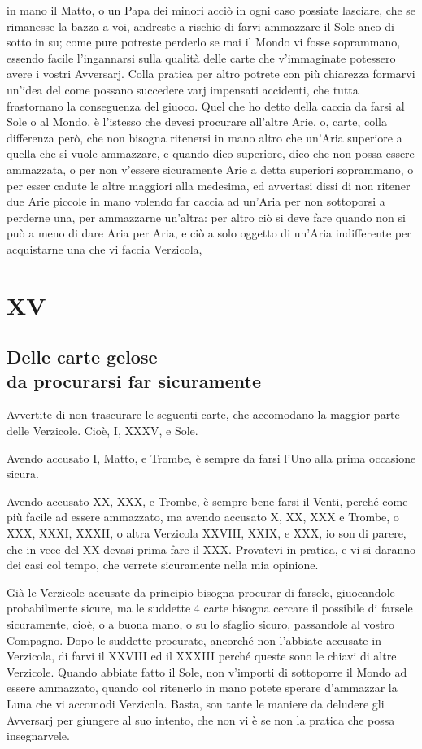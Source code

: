 \documentclass[11pt,a6paper]{article}
\begin{document}
in mano il Matto, o un Papa dei minori acciò in ogni caso possiate lasciare, che se rimanesse la bazza a voi, andreste a rischio di farvi ammazzare il Sole anco di sotto in su; come pure potreste perderlo se mai il Mondo vi fosse soprammano, essendo facile l'ingannarsi sulla qualità delle carte che v'immaginate potessero avere i vostri Avversarj. Colla pratica per altro potrete con più chiarezza formarvi un'idea del come possano succedere varj impensati accidenti, che tutta frastornano la conseguenza del giuoco. Quel che ho detto della caccia da farsi al Sole o al Mondo, è l'istesso che devesi procurare all'altre Arie, o, carte, colla differenza però, che non bisogna ritenersi in mano altro che un'Aria superiore a quella che si vuole ammazzare, e quando dico superiore, dico che non possa essere ammazzata, o per non v'essere sicuramente Arie a detta superiori soprammano, o per esser cadute le altre maggiori alla medesima, ed avvertasi dissi di non ritener due Arie piccole in mano
volendo far caccia ad un'Aria per non sottoporsi a perderne una, per ammazzarne un'altra: per altro ciò si deve fare quando non si può a meno di dare Aria per Aria, e ciò a solo oggetto di un'Aria indifferente per acquistarne una che vi faccia Verzicola,

\section{XV}
\subsection*{Delle carte gelose\\ da procurarsi far sicuramente}

Avvertite di non trascurare le seguenti carte, che accomodano la maggior parte delle Verzicole. Cioè, I, XXXV, e Sole.

Avendo accusato I, Matto, e Trombe, è sempre da farsi l'Uno alla prima occasione sicura.

Avendo accusato XX, XXX, e Trombe, è sempre bene farsi il Venti, perché come più facile ad essere ammazzato, ma avendo accusato X, XX, XXX e Trombe, o XXX, XXXI, XXXII, o altra Verzicola XXVIII, XXIX, e XXX, io son di parere, che in vece del XX devasi prima fare il XXX. Provatevi in pratica, e vi si daranno dei casi col tempo, che verrete sicuramente nella mia opinione.

Già le Verzicole accusate da principio bisogna procurar di farsele, giuocandole probabilmente sicure, ma le suddette 4 carte bisogna cercare il possibile di farsele sicuramente, cioè, o a buona mano, o su lo sfaglio sicuro, passandole al vostro Compagno. Dopo le suddette procurate, ancorché non l'abbiate accusate in Verzicola, di farvi il XXVIII ed il XXXIII perché queste sono le chiavi di altre Verzicole. Quando abbiate fatto il Sole, non v'importi di sottoporre il Mondo ad essere ammazzato, quando col ritenerlo in mano potete sperare d’ammazzar la Luna che vi accomodi Verzicola. Basta, son tante le maniere da deludere gli Avversarj per giungere al suo intento, che non vi è se non la pratica che possa insegnarvele.
\end{document}

